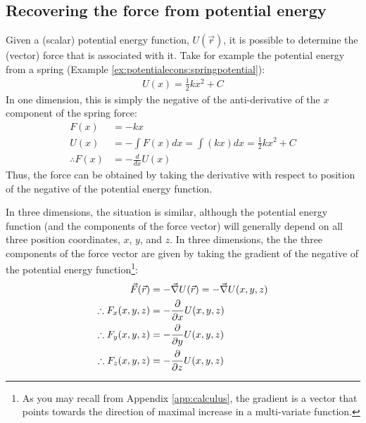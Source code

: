 \subsection{Recovering the force from potential energy}
Given a (scalar) potential energy function, $U(\vec r)$, it is possible to determine the (vector) force that is associated with it. Take for example the potential energy from a spring (Example \ref{ex:potentialecons:springpotential}):
\begin{align*}
U(x) = \frac{1}{2}kx^2 + C
\end{align*} 
In one dimension, this is simply the negative of the anti-derivative of the $x$ component of the spring force:
\begin{align*}
F(x) &= -kx\\
U(x) &= -\int F(x) dx = \int (kx) dx = \frac{1}{2}kx^2+C\\
\therefore F(x) &= -\frac{d}{dx}U(x)
\end{align*}
Thus, the force can be obtained by taking the derivative with respect to position of the negative of the potential energy function. 

In three dimensions, the situation is similar, although the potential energy function (and the components of the force vector) will generally depend on all three position coordinates, $x$, $y$, and $z$. In three dimensions, the the three components of the force vector are given by taking the gradient of the negative of the potential energy function\footnote{As you may recall from Appendix \ref{app:calculus}, the gradient is a vector that points towards the direction of maximal increase in a multi-variate function.}:
\begin{align}
\vec F(\vec r) &= -\vec\nabla U(\vec r)=-\vec\nabla U(x,y,z)\nonumber\\
\therefore F_x(x,y,z) &= -\frac{\partial }{\partial x}U(x,y,z)\nonumber\\
\therefore F_y(x,y,z) &= -\frac{\partial }{\partial y}U(x,y,z)\nonumber\\
\therefore F_z(x,y,z) &= -\frac{\partial }{\partial z}U(x,y,z)
\end{align}

